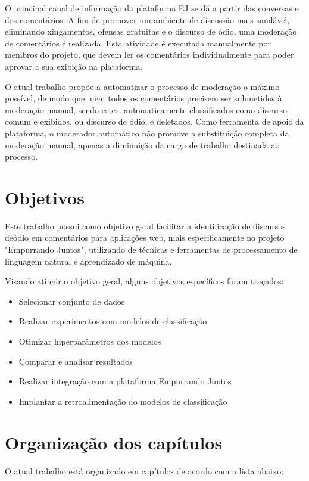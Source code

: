 O principal canal de informação da plataforma EJ se dá a partir das conversas e dos comentários. A fim de promover um ambiente de discussão mais saudável, eliminando xingamentos, ofensas gratuitas e o discurso de ódio, uma moderação de comentários é realizada. Esta atividade é executada manualmente por membros do projeto, que devem ler os comentários individualmente para poder aprovar a sua exibição na plataforma.

O atual trabalho propõe a automatizar o processo de moderação o máximo possível, de modo que, nem todos os comentários precisem ser submetidos à moderação manual, sendo estes, automaticamente classificados como discurso comum e exibidos, ou discurso de ódio, e deletados. Como ferramenta de apoio da plataforma, o moderador automático não promove a substituição completa da moderação manual, apenas a diminuição da carga de trabalho destinada ao processo.

\section[Objetivos]{Objetivos}

Este trabalho possui como objetivo geral facilitar a identificação de discursos deódio em comentários para aplicações web, mais especificamente no projeto "Empurrando Juntos", utilizando de técnicas e ferramentas de processamento de linguagem natural e aprendizado de máquina.

Visando atingir o objetivo geral, alguns objetivos específicos foram traçados:

\begin{itemize}
\item Selecionar conjunto de dados
\item Realizar experimentos com modelos de classificação
\item Otimizar hiperparâmetros dos modelos
\item Comparar e analisar resultados
\item Realizar integração com a plataforma Empurrando Juntos
\item Implantar a retroalimentação do modelos de classificação
\end{itemize}

\section[Organização dos capítulos]{Organização dos capítulos}

O atual trabalho está organizado em capítulos de acordo com a lista abaixo:

